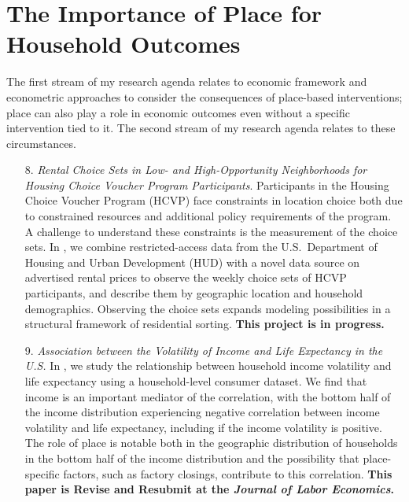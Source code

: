 \section{The Importance of Place for Household Outcomes}


The first stream of my research agenda relates to economic framework and econometric approaches to consider the consequences of place-based interventions; place can also play a role in economic outcomes even without a specific intervention tied to it. The second stream of my research agenda relates to these circumstances.

\begin{enumerate}

\item[8.] \textit{Rental Choice Sets in Low- and High-Opportunity Neighborhoods for Housing Choice Voucher Program Participants}. Participants in the Housing Choice Voucher Program (HCVP) face constraints in location choice both due to constrained resources and additional policy requirements of the program. A challenge to understand these constraints is the measurement of the choice sets. In \citet{park_rental_2023}, we combine restricted-access data from the U.S.\ Department of Housing and Urban Development (HUD) with a novel data source on advertised rental prices to observe the weekly choice sets of HCVP participants, and describe them by geographic location and household demographics. Observing the choice sets expands modeling possibilities in a structural framework of residential sorting. \textbf{This project is in progress.}


\item[9.] \textit{Association between the Volatility of Income and Life Expectancy in the U.S.} In \citet{ziff_association_2023}, we study the relationship between household income volatility and life expectancy using a household-level consumer dataset. We find that income is an important mediator of the correlation, with the bottom half of the income distribution experiencing negative correlation between income volatility and life expectancy, including if the income volatility is positive. The role of place is notable both in the geographic distribution of households in the bottom half of the income distribution and the possibility that place-specific factors, such as factory closings, contribute to this correlation. \textbf{This paper is Revise and Resubmit at the \textit{Journal of Labor Economics}.}


\end{enumerate}

